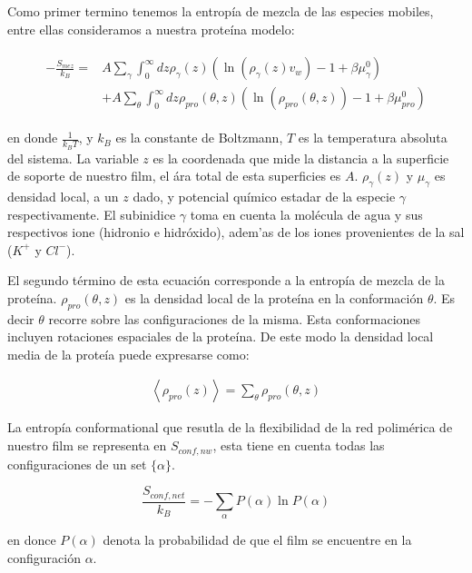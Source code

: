 Como primer termino tenemos la entrop\'ia de mezcla de  las especies mobiles, entre ellas consideramos a nuestra prote\'ina modelo:

\begin{align}
	\begin{aligned}
		-\frac{S_{mez}}{k_B}= &A\sum_{\gamma}\int_0^\infty{dz\rho_\gamma(z)\left(\ln \left(\rho_\gamma (z)v_w\right) -1 + \beta\mu^0_\gamma\right)} \\
		&+ A\sum_{\theta}\int_0^\infty{dz\rho_{pro}(\theta,z)\left(\ln \left(\rho_{pro}(\theta,z)\right) -1 + \beta\mu^0_{pro} \right)}
	\end{aligned}
\end{align}

\noindent en donde $\frac{1}{k_B T}$, y $k_B$ es la constante de Boltzmann, $T$ es la temperatura absoluta del sistema. La variable $z$ es la coordenada que mide la distancia a la superficie de soporte de nuestro film, el \'ara total de esta superficies es $A$. $\rho_\gamma(z)$ y $\mu_\gamma$ es densidad local, a un $z$ dado, y potencial qu\'imico estadar de la especie $\gamma$ respectivamente.
El subinidice $\gamma$ toma en cuenta la mol\'ecula de agua y sus respectivos ione (hidronio e hidr\'oxido), adem'as de los iones provenientes de la sal ($K^+$ y $Cl^-$). 


El segundo t\'ermino de esta ecuaci\'on corresponde a la entrop\'ia de mezcla de la prote\'ina. $\rho_{pro}(\theta,z)$ es la densidad local de la prote\'ina en la conformaci\'on $\theta$. Es decir $\theta$ recorre sobre las configuraciones de la misma.
Esta conformaciones incluyen rotaciones espaciales de la prote\'ina.
De este modo la densidad local media de la prote\'ia puede expresarse como:


\begin{align}
	\left<\rho_{pro}(z)\right> = \sum_\theta{\rho_{pro}(\theta,z)}
\end{align}


La entrop\'ia conformational que resutla de la flexibilidad de la red polim\'erica de nuestro film se representa en $S_{conf, nw}$, esta tiene en cuenta todas las configuraciones de un set $\{\alpha\}$.

\begin{equation}
	\frac{S_{conf,net}}{k_B} = - \sum_{\alpha}{P(\alpha)\ln P(\alpha)}
\end{equation}

\noindent en donce $P(\alpha)$ denota la probabilidad de que el film se encuentre en la configuraci\'on $\alpha$.


